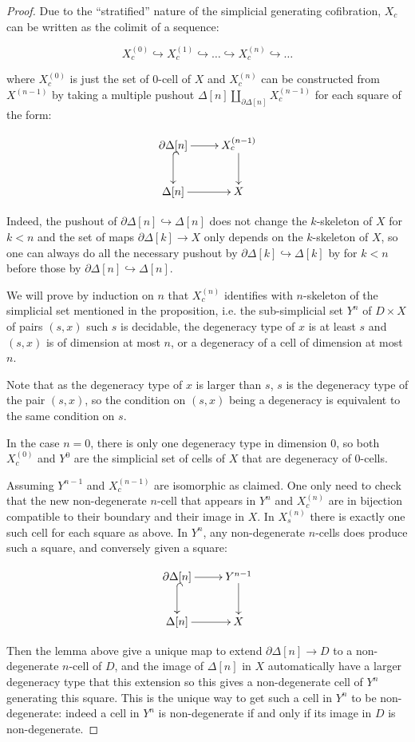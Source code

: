 \documentclass[reqno,10pt,a4paper,oneside,draft]{amsart}
\begin{document}
\begin{proof}

Due to the ``stratified'' nature of the simplicial generating cofibration, $X_c$ can be written as the colimit of a sequence:


 \[ X^{(0)}_c \hookrightarrow X^{(1)}_c \hookrightarrow \dots \hookrightarrow X^{(n)}_c \hookrightarrow \dots \]

where $X^{(0)}_c$ is just the set of $0$-cell of $X$ and $X^{(n)}_c$ can be constructed from $X^{(n-1)}$ by taking a multiple pushout $\Delta[n] \coprod_{\partial \Delta[n]} X^{(n-1)}_c$ for each square of the form:

\[ \xymatrix{\partial \Delta[n]  \ar[r] \ar@{^{(}->}[d] & X^{(n-1)}_c \ar[d] \\ \Delta[n]  \ar[r] & X} \]

Indeed, the pushout of $\partial \Delta[n] \hookrightarrow \Delta[n]$ does not change the $k$-skeleton of $X$ for $k <n$ and the set of maps $\partial \Delta[k] \rightarrow X$ only depends on the $k$-skeleton of $X$, so one can always do all the necessary pushout by $\partial \Delta[k] \hookrightarrow \Delta[k]$ by for $k<n$ before those by $\partial \Delta[n] \hookrightarrow \Delta[n]$.


We will prove by induction on $n$ that $X^{(n)}_c$ identifies with $n$-skeleton of the simplicial set mentioned in the proposition, i.e. the sub-simplicial set $Y^n$ of $D \times X$ of pairs $(s,x)$ such $s$ is decidable,  the degeneracy type of $x$ is at least $s$ and $(s,x)$ is of dimension at most $n$, or a degeneracy of a cell of dimension at most $n$.

Note that as the degeneracy type of $x$ is larger than $s$, $s$ is the degeneracy type of the pair $(s,x)$, so the condition on $(s,x)$ being a degeneracy is equivalent to the same condition on $s$.

In the case $n=0$, there is only one degeneracy type in dimension $0$, so both $X^{(0)}_c$ and $Y^0$ are the simplicial set of cells of $X$ that are degeneracy of $0$-cells.

Assuming $Y^{n-1}$ and $X^{(n-1)}_c$ are isomorphic as claimed. One only need to check that the new non-degenerate $n$-cell that appears in $Y^{n}$ and $X^{(n)}_c$ are in bijection compatible to their boundary and their image in $X$.
In $X^{(n)}_s$ there is exactly one such cell for each square as above. In $Y^{n}$, any non-degenerate $n$-cells does produce such a square, and conversely given a square:

\[ \xymatrix{\partial \Delta[n]  \ar[r] \ar@{^{(}->}[d] & Y^{n-1} \ar[d] \\ \Delta[n]  \ar[r] & X} \]

Then the lemma above give a unique map to extend $\partial \Delta[n] \rightarrow D$ to a non-degenerate $n$-cell of $D$, and the image of $\Delta[n]$ in $X$ automatically have a larger degeneracy type that this extension so this gives a non-degenerate cell of $Y^{n}$ generating this square. This is the unique way to get such a cell in $Y^n$ to be non-degenerate: indeed a cell in $Y^n$ is non-degenerate if and only if its image in $D$ is non-degenerate.
\end{proof}
\end{document}
